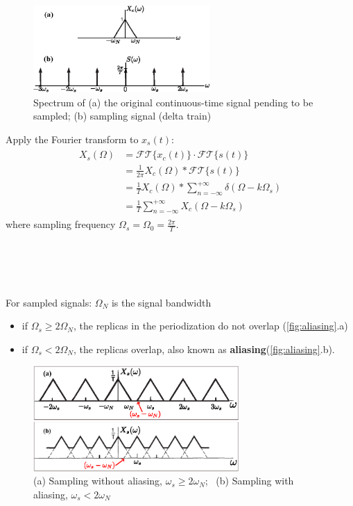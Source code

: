 \begin{minipage}{\textwidth}
\begin{figure}
    \includegraphics[width = 0.6\textwidth]{images/sample_signal_delta_train.eps}
    \caption{Spectrum of (a) the original continuous-time signal pending to be sampled; (b) sampling signal (delta train)}
    \label{fig:original_signal}
\end{figure}
Apply the Fourier transform to  $x_{s}(t)$:
\begin{align*} 
\begin{split}
    X_{s}(\Omega) 
    & = \mathcal{FT}\{x_{c}(t)\} \cdot \mathcal{FT}\{s(t)\}\\
    & = \frac{1}{2\pi} X_{c}(\Omega) * \mathcal{FT}\{s(t)\} \\
    & = \frac{1}{T} X_{c}(\Omega) * \sum_{n=-\infty}^{+\infty} \delta (\Omega - k \Omega_{s})\\
    & = \boxed{\frac{1}{T} \sum_{n=-\infty}^{+\infty}  X_{c}(\Omega - k \Omega_{s})}
\end{split} 
\end{align*}
where sampling frequency $\Omega_{s}=\Omega_{0}=\frac{2\pi}{T}$.
\end{minipage}
\ \\\\\\\\
For sampled signals: $\Omega_{N}$ is the signal bandwidth
\begin{itemize}
    \item if $\Omega_{s} \geq 2\Omega_{N}$, the replicas in the periodization do not overlap (\autoref{fig:aliasing}.a)
    \item if $\Omega_{s} < 2\Omega_{N}$, the replicas overlap, also known as \textbf{aliasing}(\autoref{fig:aliasing}.b).
\end{itemize} 

\begin{figure}[H]
    \centering
    \includegraphics[width = 0.7\textwidth]{images/sampling_aliasing.eps}
    \caption{(a) Sampling without aliasing, $\omega_{s} \geq 2\omega_{N}$; \ (b) Sampling with aliasing, $\omega_{s} < 2\omega_{N}$} 
    \label{fig:aliasing}
\end{figure}

